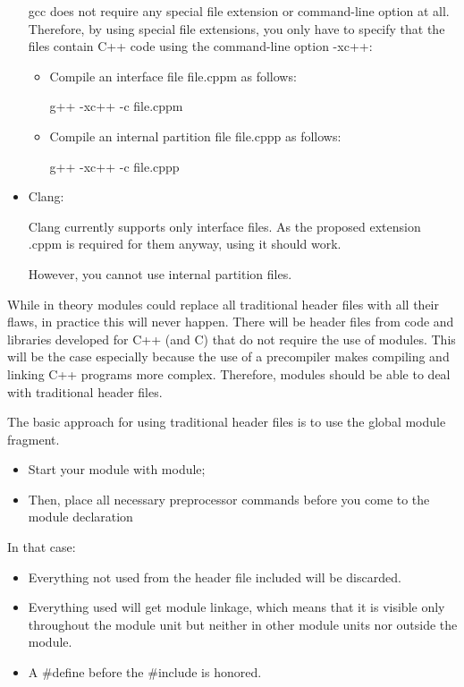 \begin{itemize}
gcc does not require any special file extension or command-line option at all. Therefore, by using special file extensions, you only have to specify that the files contain C++ code using the command-line option -xc++:

\begin{itemize}
\item 
Compile an interface file file.cppm as follows:

\begin{shell}
g++ -xc++ -c file.cppm
\end{shell}

\item
Compile an internal partition file file.cppp as follows:

\begin{shell}
g++ -xc++ -c file.cppp
\end{shell}
\end{itemize}

\item 
Clang:

Clang currently supports only interface files. As the proposed extension .cppm is required for them anyway, using it should work.

However, you cannot use internal partition files.
\end{itemize}



While in theory modules could replace all traditional header files with all their flaws, in practice this will never happen. There will be header files from code and libraries developed for C++ (and C) that do not require the use of modules. This will be the case especially because the use of a precompiler makes compiling and linking C++ programs more complex. Therefore, modules should be able to deal with traditional header files.

The basic approach for using traditional header files is to use the global module fragment.

\begin{itemize}
\item 
Start your module with module;

\item 
Then, place all necessary preprocessor commands before you come to the module declaration
\end{itemize}

In that case:

\begin{itemize}
\item 
Everything not used from the header file included will be discarded.

\item 
Everything used will get module linkage, which means that it is visible only throughout the module unit but neither in other module units nor outside the module.

\item 
A \#define before the \#include is honored.
\end{itemize}

